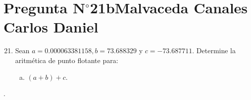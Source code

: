 \section{Pregunta N$^{\circ}$21b\qquad Malvaceda Canales Carlos Daniel}

\begin{frame}
	\begin{enumerate}\setcounter{enumi}{20}
		\item

		      Sean $a=0.000063381158, b=73.688329$ y $c=-73.687711$.
		      Determine la aritmética de punto flotante para:

		      \begin{enumerate}[b)]
			      \item

			            $\left(a+b\right)+c$.
		      \end{enumerate}
	\end{enumerate}

	\begin{solution}
		.
	\end{solution}
\end{frame}